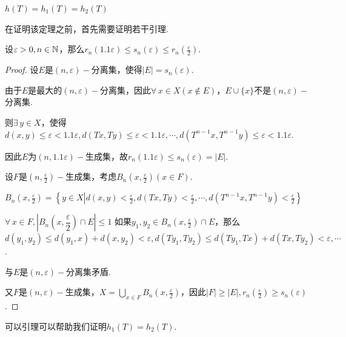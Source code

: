 \begin{theorem}\label{thm:4.2}
    $h(T)=h_1(T)=h_2(T)$
\end{theorem}

在证明该定理之前，首先需要证明若干引理.

\begin{lemma}{}
    设$\varepsilon>0,n\in\mathbb{N}$，那么$r_n(1.1\varepsilon)\leq s_n(\varepsilon)\leq r_n \left(\frac{\varepsilon}{2}\right)$.
\end{lemma}
\begin{proof}
    设$E$是$(n,\varepsilon)-$分离集，使得$|E|=s_n(\varepsilon)$.\par
    由于$E$是最大的$(n,\varepsilon)-$分离集，因此$\forall\, x\in X(x\notin E)$，$E\cup\{x\}$不是$(n,\varepsilon)-$分离集.\par
    则$\exists\, y\in X$，使得$d(x,y)\leq\varepsilon <1.1\varepsilon,d(Tx,Ty)\leq\varepsilon<1.1\varepsilon,\cdots,d \left(T^{n-1}x,T^{n-1}y\right)\leq\varepsilon<1.1\varepsilon$.\par
    因此$E$为$(n,1.1\varepsilon)-$生成集，故$r_n(1.1\varepsilon)\leq s_n(\varepsilon)=|E|$.\par
    设$F$是$\left(n,\frac{\varepsilon}{2}\right)-$生成集，考虑$B_n \left(x,\frac{\varepsilon}{2}\right)(x\in F)$.\par
    $B_n \left(x,\frac{\varepsilon}{2}\right)=\left\{y\in X\left|d(x,y)<\frac{\varepsilon}{2},d(Tx,Ty)<\frac{\varepsilon}{2},\cdots,d \left(T^{n-1}x,T^{n-1}y\right)<\frac{\varepsilon}{2}\right.\right\}$\par
    \begin{claim}{$\forall\, x\in F,\left|B_n \left(x,\dfrac{\varepsilon}{2}\right)\cap E\right|\leq 1$}
        如果$y_1,y_2\in B_n \left(x,\frac{\varepsilon}{2}\right)\cap E$，那么$d(y_1,y_2)\leq d(y_1,x)+d(x,y_2)<\varepsilon,d(Ty_1,Ty_2)\leq d(Ty_1,Tx)+d(Tx,Ty_2)<\varepsilon,\cdots$.\par
        与$E$是$(n,\varepsilon)-$分离集矛盾.
    \end{claim}\par
    又$F$是$(n,\varepsilon)-$生成集，$X=\bigcup_{x\in F}{B_n \left(x,\frac{\varepsilon}{2}\right)}$，因此$|F|\geq |E|,r_n \left(\frac{\varepsilon}{2}\right)\geq s_n(\varepsilon)$.
\end{proof}
可以引理可以帮助我们证明$h_1(T)=h_2(T)$.\par

